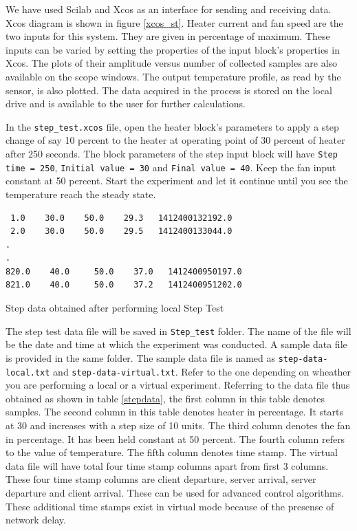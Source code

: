 We have used Scilab and Xcos as an interface for sending and receiving data. 
Xcos diagram is shown in figure \ref{xcos_st}. Heater current and fan speed are the two inputs for this system. 
They are given in percentage of maximum. These inputs can be varied by setting the properties of the input block's properties 
in Xcos. The plots of their amplitude versus number of collected samples are also available on the scope windows. 
The output temperature profile, as read by the sensor, is also plotted. The data acquired in the process is stored on the 
local drive and is available to the user for further calculations.

 In the {\tt step\_test.xcos} file, open the heater block's parameters to apply a step change of say 10 percent to the heater at operating point of 30 percent of heater after 250 seconds. The block parameters of the step input block will have {\tt Step time = 250}, {\tt Initial value = 30} and {\tt Final value = 40}. 
Keep the fan input constant at 50 percent. Start the experiment and let it continue until you see the temperature 
reach the steady state. 

\begin{table}
\begin{verbatim}
 1.0    30.0    50.0    29.3   1412400132192.0
 2.0    30.0    50.0    29.5   1412400133044.0
.
.
820.0    40.0     50.0    37.0   1412400950197.0
821.0    40.0     50.0    37.2   1412400951202.0
\end{verbatim}
\caption{Step data obtained after performing local Step Test}
\label{stepdata}
\end{table}

The step test data file will be saved in {\tt Step\_test} folder. The name of the file will be the date and time at which the experiment was conducted. A sample data file is provided in the same folder. The sample data file is named as {\tt step-data-local.txt} and {\tt step-data-virtual.txt}. Refer to the one depending on wheather you are performing a local or a virtual experiment. Referring to the data file thus obtained as shown in table \ref{stepdata}, the first column in this table denotes samples. The second column in this table denotes heater in percentage. It starts at 30 and increases with a step size of 10 units. The third column denotes the fan in percentage. It has been held constant at 50 percent. The fourth column refers to the value of temperature. The fifth column denotes time stamp. The virtual data file will have total four time stamp columns apart from first 3 columns. These four time stamp columns are client departure, server arrival, server departure and client arrival. These can be used for advanced control algorithms. These additional time stamps exist in virtual mode because of the presense of network delay.
